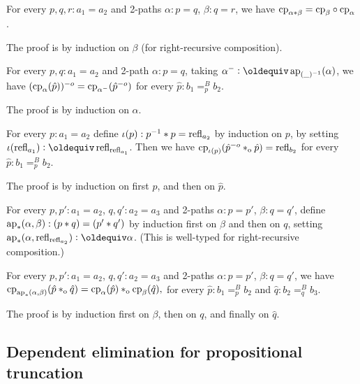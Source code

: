 \documentclass[a4paper,12pt]{amsart}
\begin{document}
\begin{lemma}\label{lem:functorial-change-path}
  For every $p,q,r:a_1=a_2$ and 2-paths $\alpha : p = q$, $\beta : q = r$,
  we have $\mathrm{cp}_{\alpha*\beta}=\mathrm{cp}_{\beta}\circ\mathrm{cp}_{\alpha}$.
\end{lemma}

The proof is by induction on $\beta$ (for right-recursive composition).

\begin{lemma}\label{lem:inv2-change-path}
  For every  $p,q:a_1=a_2$ and 2-path $\alpha : p = q$, taking
  $\alpha^- \defeq \ap{(\blank)^{-1}}(\alpha)$, we have
  $(\mathrm{cp}_{\alpha}(\hat p))^{-o} = \mathrm{cp}_{\alpha^-}(\hat p^{-o})$
  for every $\hat p: b_1=^B_p b_2$.
\end{lemma}
 The proof is by induction on $\alpha$.

\begin{lemma}\label{lem:invlaw-change-path}
  For every  $p :a_1 = a_2$ define $\iota(p): p^{-1}* p = \mathop{{\mathrm{refl}}_{a_2}}$
  by induction on $p$, by setting $\iota(\refl{a_1})\defeq \refl{\refl{a_1}}$.
  Then we have $\mathrm{cp}_{\iota(p)}(\hat p^{-o} *_{\mathrm{o}} {\hat p}) = \mathop{{\mathrm{refl}}_{b_2}}$
  for every $\hat p: b_1=^B_p b_2$.
\end{lemma}
 The proof is by induction on first $p$, and then on $\hat p$.


\begin{definition}\label{lem:compo-ap-ap}
  For every  $p,p':a_1=a_2$, $q,q':a_2=a_3$ and 2-paths
  $\alpha : p = p'$, $\beta : q = q'$, define
  $\mathop{\mathrm{ap}_{*}}(\alpha,\beta): (p* q)=(p'* q')$ by induction
  first on $\beta$ and then on $q$,
  setting $\apc(\alpha,\refl{\refl{a_2}}) \defeq \alpha$.
  (This is well-typed for right-recursive composition.)
\end{definition}

\begin{lemma}\label{lem:compo-change-path}
  For every  $p,p':a_1=a_2$, $q,q':a_2=a_3$ and 2-paths
  $\alpha : p = p'$, $\beta : q = q'$, we have
  $\mathrm{cp}_{\mathop{\mathrm{ap}_{*}}(\alpha,\beta)}(\hat p *_{\mathrm{o}} \hat q) =
   \mathrm{cp}_{\alpha}(\hat p) *_{\mathrm{o}}  \mathrm{cp}_{\beta}(\hat q),$
  for every $\hat p: b_1=^B_p b_2$ and $\hat q: b_2=^B_q b_3$.
\end{lemma}
 The proof is by induction first on $\beta$, then on $q$, and finally on $\hat q$.

\subsection{Dependent elimination for propositional truncation}\label{sec:proptrunc}
\end{document}
